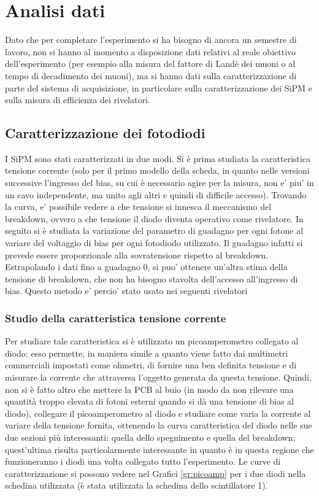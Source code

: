 \section{Analisi dati}
Dato che per completare l'esperimento si ha bisogno di ancora un semestre di lavoro, non si hanno al momento a disposizione dati relativi al reale obiettivo dell'esperimento
(per esempio alla misura del fattore di Landè dei muoni o al tempo di decadimento dei muoni), ma si hanno dati sulla caratterizzazione di parte del sistema di acquisizione,
in particolare sulla caratterizzazione dei SiPM e sulla misura di efficienza dei rivelatori.

\subsection{Caratterizzazione dei fotodiodi}
I SiPM sono stati caratterizzati in due modi. Si è prima studiata la caratteristica tensione corrente (solo per il primo modello della scheda, in quanto nelle versioni successive l'ingresso del bias, su cui \`e necessario agire per la misura, non e' piu' in un cavo independente, ma unito agli altri e quindi di difficile accesso). Trovando la curva, e' possibile vedere a che tensione si innesca il meccanismo del breakdown, ovvero a che tensione il diodo diventa operativo come rivelatore.
In seguito si è studiata la variazione del parametro di guadagno per ogni fotone al variare del voltaggio di bias per ogni fotodiodo utilizzato. Il guadagno infatti si prevede essere proporzionale alla sovratensione rispetto al breakdown. Estrapolando i dati fino a guadagno 0, si puo' ottenere un'altra stima della tensione di breakdown, che non ha bisogno stavolta dell'accesso all'ingresso di bias. Questo metodo e' percio' stato usato nei seguenti rivelatori

\subsubsection{Studio della caratteristica tensione corrente}
Per studiare tale caratteristica si è utilizzato un picoamperometro collegato al diodo: esso permette, in maniera simile a quanto viene fatto dai multimetri commerciali
impostati come ohmetri, di fornire una ben definita tensione e di misurare la corrente che attraversa l'oggetto generata da questa tensione. Quindi,
non si è fatto altro che mettere la PCB al buio (in modo da non rilevare una quantità troppo elevata di fotoni esterni quando si dà una tensione di bias al diodo),
collegare il picoamperometro al diodo e studiare come varia la corrente al variare della tensione fornita, ottenendo la curva caratteristica del diodo nelle sue due
sezioni più interessanti: quella dello spegnimento e quella del breakdown; quest'ultima risulta particolarmente interessante in quanto è in questa regione che funzioneranno
i diodi una volta collegato tutto l'esperimento. Le curve di caratterizzazione si possono vedere nel Grafici \ref{gr:picoamp} per i due  diodi nella schedina utilizzata (è stata utilizzata la schedina dello scintillatore 1).

